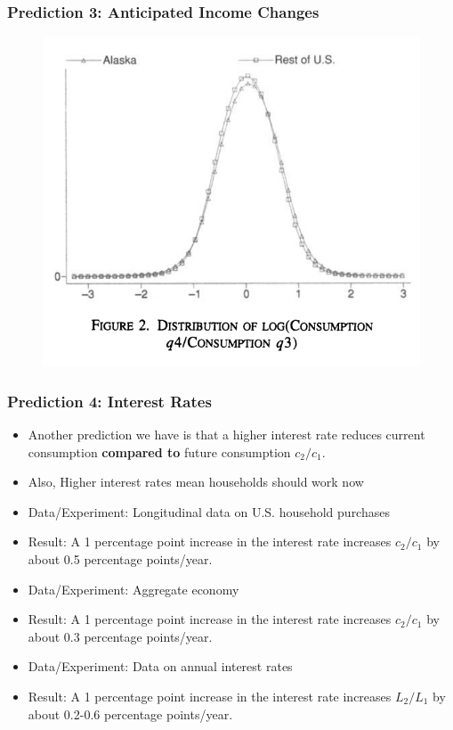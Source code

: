 \documentclass{beamer}
\begin{document}
\begin{frame}
\frametitle{Prediction 3: Anticipated Income Changes}
\begin{figure}
\centering
\bigskip
\includegraphics[scale=0.7]{Figures/Hseih2003.png}
\end{figure}
\end{frame}



\begin{frame}
\frametitle{Prediction 4: Interest Rates}
\begin{itemize}
\item Another prediction we have is that a higher interest rate reduces current consumption \textbf{compared to} future consumption $c_2/c_1$.  
\item Also, Higher interest rates mean households should work now
\bigskip
\item Data/Experiment:  Longitudinal data on U.S. household purchases
\bigskip
\item Result:  A 1 percentage point increase in the interest rate increases $c_2/c_1$ by about 0.5 percentage points/year.
\bigskip
\item Data/Experiment:  Aggregate economy
\bigskip
\item Result:  A 1 percentage point increase in the interest rate increases $c_2/c_1$ by about 0.3 percentage points/year.
\bigskip
\item Data/Experiment:  Data on annual interest rates
\bigskip
\item Result:  A 1 percentage point increase in the interest rate increases $L_2/L_1$ by about 0.2-0.6 percentage points/year.
\end{itemize}
\end{frame}
\end{document}
